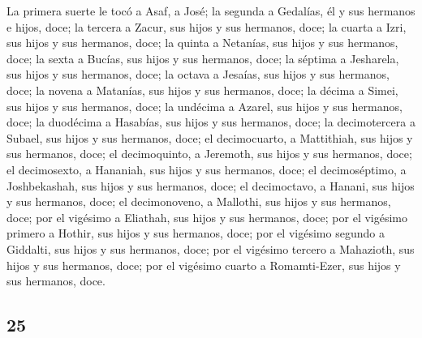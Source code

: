\begin{paracol}{2}
 La primera suerte le tocó a Asaf, a José; la segunda a
Gedalías, él y sus hermanos e hijos, doce;  la tercera a
Zacur, sus hijos y sus hermanos, doce;  la cuarta a Izri,
sus hijos y sus hermanos, doce;  la quinta a Netanías,
sus hijos y sus hermanos, doce;  la sexta a Bucías, sus
hijos y sus hermanos, doce;  la séptima a Jesharela, sus
hijos y sus hermanos, doce;  la octava a Jesaías, sus
hijos y sus hermanos, doce;  la novena a Matanías, sus
hijos y sus hermanos, doce;  la décima a Simei, sus hijos
y sus hermanos, doce;  la undécima a Azarel, sus hijos y
sus hermanos, doce;  la duodécima a Hasabías, sus hijos y
sus hermanos, doce;  la decimotercera a Subael, sus hijos
y sus hermanos, doce;  el decimocuarto, a Mattithiah, sus
hijos y sus hermanos, doce;  el decimoquinto, a Jeremoth,
sus hijos y sus hermanos, doce;  el decimosexto, a
Hananiah, sus hijos y sus hermanos, doce;  el
decimoséptimo, a Joshbekashah, sus hijos y sus hermanos, doce;
 el decimoctavo, a Hanani, sus hijos y sus hermanos,
doce;  el decimonoveno, a Mallothi, sus hijos y sus
hermanos, doce;  por el vigésimo a Eliathah, sus hijos y
sus hermanos, doce;  por el vigésimo primero a Hothir,
sus hijos y sus hermanos, doce;  por el vigésimo segundo
a Giddalti, sus hijos y sus hermanos, doce;  por el
vigésimo tercero a Mahazioth, sus hijos y sus hermanos, doce;
 por el vigésimo cuarto a Romamti-Ezer, sus hijos y sus
hermanos, doce.

\switchcolumn
\begin{otherlanguage}{english}

\hypertarget{section-49}{%
\section{25}\label{section-49}}


\end{otherlanguage}
\end{paracol}
